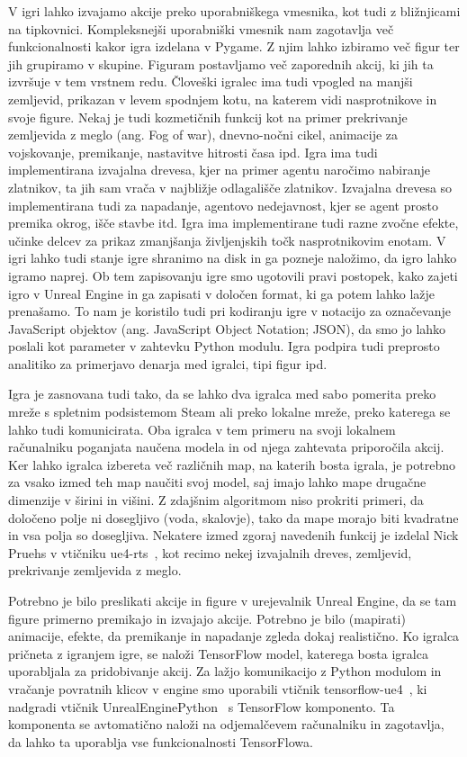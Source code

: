 \documentclass[a4paper, 12pt]{book}
\begin{document}
V igri lahko izvajamo akcije preko uporabniškega vmesnika, kot tudi z bližnjicami na tipkovnici.
Kompleksnejši uporabniški vmesnik nam zagotavlja več funkcionalnosti kakor igra izdelana v Pygame.
Z njim lahko izbiramo več figur ter jih grupiramo v skupine.
Figuram postavljamo več zaporednih akcij, ki jih ta izvršuje v tem vrstnem redu.
Človeški igralec ima tudi vpogled na manjši zemljevid, prikazan v levem spodnjem kotu, na katerem vidi nasprotnikove in svoje figure.
Nekaj je tudi kozmetičnih funkcij kot na primer prekrivanje zemljevida z meglo (ang. Fog of war), dnevno-nočni cikel, animacije za vojskovanje, premikanje, nastavitve hitrosti časa ipd.
Igra ima tudi implementirana izvajalna drevesa, kjer na primer agentu naročimo nabiranje zlatnikov, ta jih sam vrača v najbližje odlagališče zlatnikov.
Izvajalna drevesa so implementirana tudi za napadanje, agentovo nedejavnost, kjer se agent prosto premika okrog, išče stavbe itd.
Igra ima implementirane tudi razne zvočne efekte, učinke delcev za prikaz zmanjšanja življenjskih točk nasprotnikovim enotam.
V igri lahko tudi stanje igre shranimo na disk in ga pozneje naložimo, da igro lahko igramo naprej.
Ob tem zapisovanju igre smo ugotovili pravi postopek, kako zajeti igro v Unreal Engine in ga zapisati v določen format, ki ga potem lahko lažje prenašamo.
To nam je koristilo tudi pri kodiranju igre v notacijo za označevanje JavaScript objektov (ang. JavaScript Object Notation; JSON), da smo jo lahko poslali kot parameter v zahtevku Python modulu.
Igra podpira tudi preprosto analitiko za primerjavo denarja med igralci, tipi figur ipd.

Igra je zasnovana tudi tako, da se lahko dva igralca med sabo pomerita preko mreže s spletnim podsistemom Steam ali preko lokalne mreže, preko katerega se lahko tudi komunicirata.
Oba igralca v tem primeru na svoji lokalnem računalniku poganjata naučena modela in od njega zahtevata priporočila akcij.
Ker lahko igralca izbereta več različnih map, na katerih bosta igrala, je potrebno za vsako izmed teh map naučiti svoj model, saj imajo lahko mape drugačne dimenzije v širini in višini.
Z zdajšnim algoritmom niso prokriti primeri, da določeno polje ni dosegljivo (voda, skalovje), tako da mape morajo biti kvadratne in vsa polja so dosegljiva.
Nekatere izmed zgoraj navedenih funkcij je izdelal Nick Pruehs v vtičniku ue4-rts~\cite{rtsUe4}, kot recimo nekej izvajalnih dreves, zemljevid, prekrivanje zemljevida z meglo.

Potrebno je bilo preslikati akcije in figure v urejevalnik Unreal Engine, da se tam figure primerno premikajo in izvajajo akcije.
Potrebno je bilo (mapirati) animacije, efekte, da premikanje in napadanje zgleda dokaj realistično.
Ko igralca pričneta z igranjem igre, se naloži TensorFlow model, katerega bosta igralca uporabljala za pridobivanje akcij.
Za lažjo komunikacijo z Python modulom in vračanje povratnih klicov v engine smo uporabili vtičnik tensorflow-ue4~\cite{ue4tf}, ki nadgradi vtičnik UnrealEnginePython~\cite{ue4python} s TensorFlow komponento. 
Ta komponenta se avtomatično naloži na odjemalčevem računalniku in zagotavlja, da lahko ta uporablja vse funkcionalnosti TensorFlowa.
 
\end{document}
